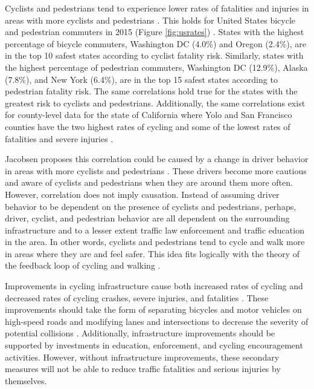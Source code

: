 \documentclass{article}
\begin{document}
Cyclists and pedestrians tend to experience lower rates of fatalities and injuries in areas with more cyclists and pedestrians \citep[Page 208]{jacobsen2003}. This holds for United States bicycle and pedestrian commuters in 2015 (Figure \ref{fig:usrates}) \citep{uscb2016} \citep{nhtsa}. States with the highest percentage of bicycle commuters, Washington DC (4.0\%) and Oregon (2.4\%), are in the top 10 safest states according to cyclist fatality risk. Similarly, states with the highest percentage of pedestrian commuters, Washington DC (12.9\%), Alaska (7.8\%), and New York (6.4\%), are in the top 15 safest states according to pedestrian fatality risk. The same correlations hold true for the states with the greatest risk to cyclists and pedestrians. Additionally, the same correlations exist for county-level data for the state of California where Yolo and San Francisco counties have the two highest rates of cycling and some of the lowest rates of fatalities and severe injuries \citep{uscb2016} \citep{chp}.

Jacobsen proposes this correlation could be caused by a change in driver behavior in areas with more cyclists and pedestrians \citep[Page 208]{jacobsen2003}. These drivers become more cautious and aware of cyclists and pedestrians when they are around them more often. However, correlation does not imply causation. Instead of assuming driver behavior to be dependent on the presence of cyclists and pedestrians, perhaps, driver, cyclist, and pedestrian behavior are all dependent on the surrounding infrastructure and to a lesser extent traffic law enforcement and traffic education in the area. In other words, cyclists and pedestrians tend to cycle and walk more in areas where they are and feel safer. This idea fits logically with the theory of the feedback loop of cycling and walking \citep[Page 8]{teschke2015}.
 
Improvements in cycling infrastructure cause both increased rates of cycling and decreased rates of cycling crashes, severe injuries, and fatalities \citep{pucher2016}. These improvements should take the form of separating bicycles and motor vehicles on high-speed roads and modifying lanes and intersections to decrease the severity of potential collisions \citep{cushing2016}. Additionally, infrastructure improvements should be supported by investments in education, enforcement, and cycling encouragement activities. However, without infrastructure improvements, these secondary measures will not be able to reduce traffic fatalities and serious injuries by themselves.
\end{document}
